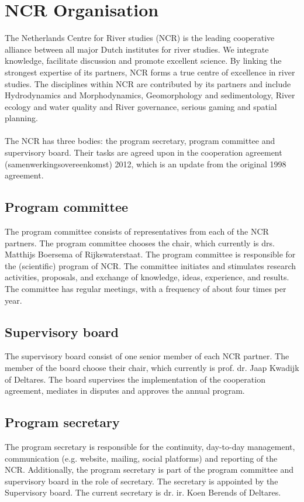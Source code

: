 \chapter{NCR Organisation}
The Netherlands Centre for River studies (NCR) is the leading cooperative alliance between all major Dutch institutes for river studies. We integrate knowledge,  facilitate discussion and promote excellent science. By linking the strongest expertise of its partners, NCR forms a true centre of excellence in river studies. The disciplines within NCR are contributed by its partners and include Hydrodynamics and Morphodynamics, Geomorphology and sedimentology, River ecology and water quality and River governance, serious gaming and spatial planning.\\
\\
The NCR has three bodies: the program secretary, program committee and supervisory board. Their tasks are agreed upon in the cooperation agreement (samenwerkingsovereenkomst) 2012, which is an update from the original 1998 agreement.\\
    
    \section{Program committee}
    The program committee consists of representatives from each of the NCR partners. The program committee chooses the chair, which currently is drs. Matthijs Boersema of Rijkswaterstaat. The program committee is responsible for the (scientific) program of NCR. The committee initiates and stimulates research activities, proposals, and exchange of knowledge, ideas, experience, and results. The committee has regular meetings, with a frequency of about four times per year.\\ 
    
    \section{Supervisory board}
    The supervisory board consist of one senior member of each NCR partner. The member of the board choose their chair, which currently is prof. dr. Jaap Kwadijk of Deltares. The board supervises the implementation of the cooperation agreement, mediates in disputes and approves the annual program.\\ 
    
    \section{Program secretary}
    The program secretary is responsible for the continuity,  day-to-day management, communication (e.g. website, mailing, social platforms) and reporting of the NCR. Additionally, the program secretary is part of the program committee and supervisory board in the role of secretary. The secretary is appointed by the Supervisory board. The current secretary is dr. ir. Koen Berends of Deltares.

